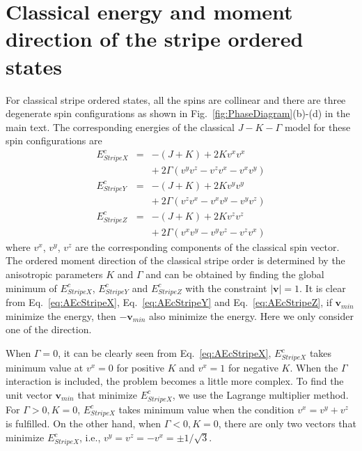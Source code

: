 \documentclass[aps,prb,reprint,amsfonts,amsmath,amssymb,showpacs,groupedaddress,superscriptaddress]{revtex4-1}
\begin{document}
\section{\label{apx:AppendixB}Classical energy and moment direction of the stripe ordered states}
For classical stripe ordered states, all the spins are collinear and there are three degenerate spin configurations as shown in Fig.~\ref{fig:PhaseDiagram}(b)-(d) in the main text. The corresponding energies of the classical $J-K-\Gamma$ model for these spin configurations are
\begin{subequations}
    \begin{eqnarray}
        E_{StripeX}^{c} & = & -(J + K) + 2 K v^x v^x \nonumber \\
            & & +\: 2 \Gamma (v^y v^z - v^z v^x - v^x v^y)
            \label{eq:AEcStripeX} \\
        E_{StripeY}^{c} & = & -(J + K) + 2 K v^y v^y \nonumber \\
            & & +\: 2 \Gamma (v^z v^x - v^x v^y - v^y v^z)
            \label{eq:AEcStripeY} \\
        E_{StripeZ}^{c} & = & -(J + K) + 2 K v^z v^z \nonumber \\
            & & +\: 2 \Gamma (v^x v^y - v^y v^z - v^z v^x)
            \label{eq:AEcStripeZ}
    \end{eqnarray}
\end{subequations}
where $v^x$, $v^y$, $v^z$ are the corresponding components of the classical spin vector. The ordered moment direction of the classical stripe order is determined by the anisotropic parameters $K$ and $\Gamma$ and can be obtained by finding the global minimum of $E_{StripeX}^{c}$, $E_{StripeY}^{c}$ and $E_{StripeZ}^{c}$ with the constraint $|\bm{v}|=1$. It is clear from Eq.~\eqref{eq:AEcStripeX}, Eq.~\eqref{eq:AEcStripeY} and Eq.~\eqref{eq:AEcStripeZ}, if $\bm{v}_{min}$ minimize the energy, then $-\bm{v}_{min}$ also minimize the energy. Here we only consider one of the direction.

When $\Gamma=0$, it can be clearly seen from Eq.~\eqref{eq:AEcStripeX}, $E_{StripeX}^c$ takes minimum value at $v^x=0$ for positive $K$ and $v^x=1$ for negative $K$. When the $\Gamma$ interaction is included, the problem becomes a little more complex. To find the unit vector $\bm{v}_{min}$ that minimize $E_{StripeX}^{c}$, we use the Lagrange multiplier method. For $\Gamma>0, K=0$, $E_{StripeX}^{c}$ takes minimum value when the condition $v^x=v^y+v^z$ is fulfilled. On the other hand, when $\Gamma<0, K=0$, there are only two vectors that minimize $E_{StripeX}^{c}$, i.e., $v^y=v^z=-v^x=\pm 1/\sqrt{3}$.
\end{document}
